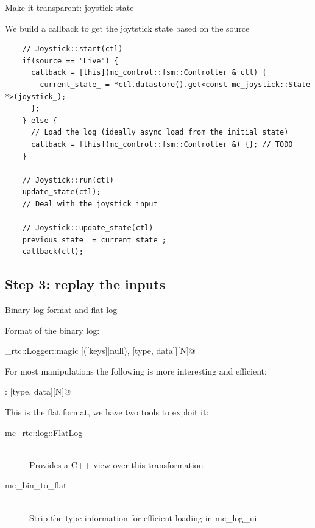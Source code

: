 \documentclass[c,aspectratio=169]{beamer}
\begin{document}
\begin{frame}[fragile]{Make it transparent: joystick state}
  \scriptsize
  \begin{block}{We build a callback to get the joytstick state based on the source}
  \begin{verbatim}
    // Joystick::start(ctl)
    if(source == "Live") {
      callback = [this](mc_control::fsm::Controller & ctl) {
        current_state_ = *ctl.datastore().get<const mc_joystick::State *>(joystick_);
      };
    } else {
      // Load the log (ideally async load from the initial state)
      callback = [this](mc_control::fsm::Controller &) {}; // TODO
    }

    // Joystick::run(ctl)
    update_state(ctl);
    // Deal with the joystick input

    // Joystick::update_state(ctl)
    previous_state_ = current_state_;
    callback(ctl);
  \end{verbatim}
  \end{block}
\end{frame}

\subsection{Step 3: replay the inputs}
\begin{frame}[fragile]{Binary log format and flat log}

  Format of the binary log:

  \verb@mc_rtc::Logger::magic [([keys]|null), [type, data]][N]@

  \vfill

  For most manipulations the following is more interesting and efficient:

  \verb@key: [type, data][N]@

  \vfill

  This is the flat format, we have two tools to exploit it:
  \begin{description}
    \item [mc\_rtc::log::FlatLog] \hfill \\ Provides a C++ view over this transformation
    \item [mc\_bin\_to\_flat] \hfill \\ Strip the type information for efficient loading in mc\_log\_ui
  \end{description}

\end{frame}
\end{document}
